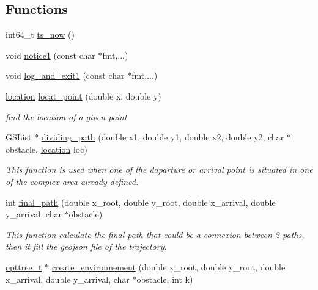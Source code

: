 \subsection*{\-Functions}
\begin{DoxyCompactItemize}
\item 
int64\-\_\-t \hyperlink{a00015_a7a93270b029dd7f09ac421ff7a473cd9_a7a93270b029dd7f09ac421ff7a473cd9}{ts\-\_\-now} ()
\item 
void \hyperlink{a00015_abb72a9e5586947ffa14de7aea6c8d7b4_abb72a9e5586947ffa14de7aea6c8d7b4}{notice1} (const char $\ast$fmt,...)
\item 
void \hyperlink{a00015_ab369473e6f056b28d426c97004c47828_ab369473e6f056b28d426c97004c47828}{log\-\_\-and\-\_\-exit1} (const char $\ast$fmt,...)
\item 
\hyperlink{a00016_a5f269c22e6d9d32b0b0ad7e6166854df_a5f269c22e6d9d32b0b0ad7e6166854df}{location} \hyperlink{a00015_a8fccd24d5b565d686f8ffd2820bf372a_a8fccd24d5b565d686f8ffd2820bf372a}{locat\-\_\-point} (double x, double y)
\begin{DoxyCompactList}\small\item\em find the location of a given point \end{DoxyCompactList}\item 
\-G\-S\-List $\ast$ \hyperlink{a00015_a25f1e769fb021e10c7a6923f56ab4f46_a25f1e769fb021e10c7a6923f56ab4f46}{dividing\-\_\-path} (double x1, double y1, double x2, double y2, char $\ast$obstacle, \hyperlink{a00016_a5f269c22e6d9d32b0b0ad7e6166854df_a5f269c22e6d9d32b0b0ad7e6166854df}{location} loc)
\begin{DoxyCompactList}\small\item\em \-This function is used when one of the daparture or arrival point is situated in one of the complex area already defined. \end{DoxyCompactList}\item 
int \hyperlink{a00015_abbed0c74429bd1201c2d98acfb81371e_abbed0c74429bd1201c2d98acfb81371e}{final\-\_\-path} (double x\-\_\-root, double y\-\_\-root, double x\-\_\-arrival, double y\-\_\-arrival, char $\ast$obstacle)
\begin{DoxyCompactList}\small\item\em \-This function calculate the final path that could be a connexion between 2 paths, then it fill the geojson file of the trajectory. \end{DoxyCompactList}\item 
\hyperlink{a00020_a07b75293fafb6f31b7e9f723848ad105_a07b75293fafb6f31b7e9f723848ad105}{opttree\-\_\-t} $\ast$ \hyperlink{a00015_a55d37159a13f40fdb4d2bda4b8a4c599_a55d37159a13f40fdb4d2bda4b8a4c599}{create\-\_\-environnement} (double x\-\_\-root, double y\-\_\-root, double x\-\_\-arrival, double y\-\_\-arrival, char $\ast$obstacle, int k)

\end{DoxyCompactItemize}
